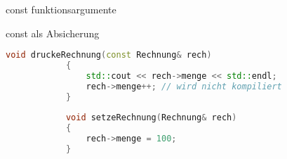 \begin{frame}[fragile]{const funktionsargumente}

	\begin{block}{const als Absicherung}
		\begin{lstlisting}[language=C++]
			void druckeRechnung(const Rechnung& rech)
			{
			    std::cout << rech->menge << std::endl;
			    rech->menge++; // wird nicht kompiliert
			}
	
			void setzeRechnung(Rechnung& rech)
			{
			    rech->menge = 100;
			}
		\end{lstlisting}
	\end{block}


\end{frame}
